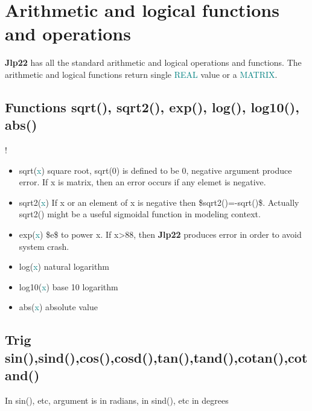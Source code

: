 {\section{Arithmetic and logical functions and operations} 
\label{arith} 
\textbf{Jlp22} has all the standard arithmetic and logical operations and functions. 
The arithmetic and logical functions return single \textcolor{teal}{REAL} value or a \textcolor{teal}{MATRIX}. 
\subsection{Functions \textcolor{VioletRed}{sqrt}(), \textcolor{VioletRed}{sqrt2}(), \textcolor{VioletRed}{exp}(), \textcolor{VioletRed}{log}(), \textcolor{VioletRed}{log10}(), \textcolor{VioletRed}{abs}()} 
\label{arfu1} 
! 
\begin{itemize} 
\item \textcolor{VioletRed}{sqrt}(\textcolor{teal}{x}) square root, \textcolor{VioletRed}{sqrt}(0) is defined to be 0, negative argument produce error. 
If {x} is matrix, then an error occurs if any elemet is negative. 
\item \textcolor{VioletRed}{sqrt2}(\textcolor{teal}{x}) If {x} or an element of {x} is negative then \$\textcolor{VioletRed}{sqrt2}()=-\textcolor{VioletRed}{sqrt}()\$. Actually \textcolor{VioletRed}{sqrt2}() might be a 
useful sigmoidal function in modeling context. 
\item \textcolor{VioletRed}{exp}(\textcolor{teal}{x}) \$e\$ to power {x}. If {x}>88, then \textbf{Jlp22} produces error in order to avoid system 
crash. 
\item \textcolor{VioletRed}{log}(\textcolor{teal}{x}) natural logarithm 
\item \textcolor{VioletRed}{log10}(\textcolor{teal}{x}) base 10 logarithm 
\item \textcolor{VioletRed}{abs}(\textcolor{teal}{x}) absolute value 
\end{itemize} 
\subsection{Trig \textcolor{VioletRed}{sin}(),\textcolor{VioletRed}{sind}(),\textcolor{VioletRed}{cos}(),\textcolor{VioletRed}{cosd}(),\textcolor{VioletRed}{tan}(),\textcolor{VioletRed}{tand}(),\textcolor{VioletRed}{cotan}(),\textcolor{VioletRed}{cotand}()} 
\label{trigfu} 
In \textcolor{VioletRed}{sin}(), etc,  argument is in radians, in \textcolor{VioletRed}{sind}(), etc in degrees 
}

